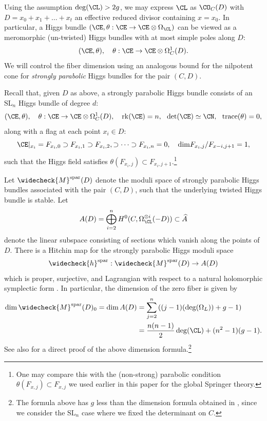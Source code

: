 Using the assumption $\deg(\CL)>2g$, we may express $\CL$ as $\CO_C(D)$ with $D = x_0 + x_1 + \dots + x_t$ an effective reduced divisor containing $x = x_0$. In particular, a Higgs bundle $(\CE, \theta: \CE \to \CE\otimes \Omega_\CL)$ can be viewed as a meromorphic (un-twisted) Higgs bundles with at most simple poles along $D$:
\[
(\CE, \theta), \quad \theta: \CE \to \CE \otimes \Omega_C^1(D).
\]
We will control the fiber dimension using an analogous bound for the nilpotent cone for \emph{strongly parabolic} Higgs bundles for the pair $(C,D)$.

Recall that, given $D$ as above, a strongly parabolic Higgs bundle consists of an $\mathrm{SL}_n$ Higgs bundle of degree $d$:
\[
(\CE, \theta), \quad \theta: \CE\to \CE \otimes \Omega^1_C(D),~~~\mathrm{rk}(\CE) =n,~~\mathrm{det}(\CE)\simeq \CN, ~~\mathrm{trace}(\theta) = 0,
\]
along with a flag at each point $x_i \in D$:
\[
\CE|_{x_i}=F_{x_i,0}  \supset F_{x_i,1} \supset F_{x_i,2}, \supset \cdots \supset F_{x_i,n} = 0, \quad \mathrm{dim} F_{x_i,j}/F_{x-i, j+1} = 1,
\]
such that the Higgs field satisfies $\theta(F_{x_i, j}) \subset F_{x_i, j+1}$.\footnote{One may compare this with the (non-strong) parabolic condition $\theta(F_{x,j}) \subset F_{x,j}$ we used earlier in this paper for the global Springer theory.}




Let $\widecheck{M}^{\mathrm{spar}}(D)$ denote the moduli space of strongly parabolic Higgs bundles associated with the pair $(C,D)$, such that the underlying twisted Higgs bundle is stable. Let
$$A(D) = \bigoplus_{i=2}^{n} H^0(C, \Omega_\CL^{\otimes i}(-D)) \subset \widehat{A}$$
denote the linear subspace consisting of sections which vanish along the points of $D$. There is a Hitchin map for the strongly parabolic Higgs moduli space
$$\widecheck{h}^{\mathrm{spar}}:\widecheck{M}^{\mathrm{spar}}(D) \rightarrow A(D)$$
which is proper, surjective, and Lagrangian with respect to a natural holomorphic symplectic form \cite{Faltings}. In particular, the dimension of the zero fiber is given by
\begin{align*}
\dim \widecheck{M}^{\mathrm{spar}}(D)_0 = \dim A(D) &= \sum_{j=2}^{n} \left((j-1)(\deg(\Omega_L)) +g-1\right)\\
&= \frac{n(n-1)}{2}\deg (\CL) + (n^2-1)(g-1).
\end{align*}
See also \cite[Theorem 6.9]{SWW} for a direct proof of the above dimension formula.\footnote{The formula above has $g$ less than the dimension formula obtained in \cite[Theorem 6.9]{SWW}, since we consider the $\mathrm{SL}_n$ case where we fixed the determinant on $C$.}

